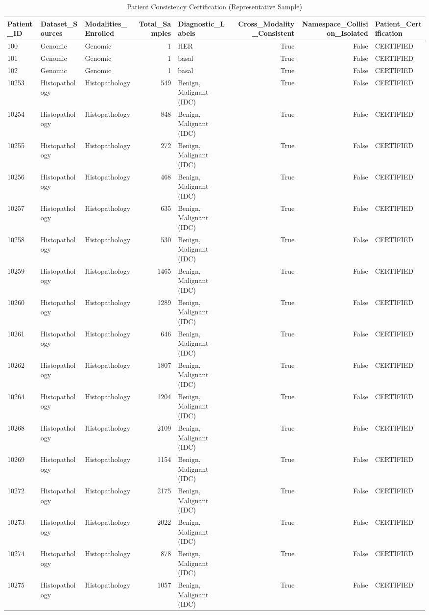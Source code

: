 \begin{table}
\caption{Patient Consistency Certification (Representative Sample)}
\label{tab:table_patient_certification}
\begin{tabular}{lllrlrrl}
\toprule
Patient\_ID & Dataset\_Sources & Modalities\_Enrolled & Total\_Samples & Diagnostic\_Labels & Cross\_Modality\_Consistent & Namespace\_Collision\_Isolated & Patient\_Certification \\
\midrule
100 & Genomic & Genomic & 1 & HER & True & False & CERTIFIED \\
101 & Genomic & Genomic & 1 & basal & True & False & CERTIFIED \\
102 & Genomic & Genomic & 1 & basal & True & False & CERTIFIED \\
10253 & Histopathology & Histopathology & 549 & Benign, Malignant (IDC) & True & False & CERTIFIED \\
10254 & Histopathology & Histopathology & 848 & Benign, Malignant (IDC) & True & False & CERTIFIED \\
10255 & Histopathology & Histopathology & 272 & Benign, Malignant (IDC) & True & False & CERTIFIED \\
10256 & Histopathology & Histopathology & 468 & Benign, Malignant (IDC) & True & False & CERTIFIED \\
10257 & Histopathology & Histopathology & 635 & Benign, Malignant (IDC) & True & False & CERTIFIED \\
10258 & Histopathology & Histopathology & 530 & Benign, Malignant (IDC) & True & False & CERTIFIED \\
10259 & Histopathology & Histopathology & 1465 & Benign, Malignant (IDC) & True & False & CERTIFIED \\
10260 & Histopathology & Histopathology & 1289 & Benign, Malignant (IDC) & True & False & CERTIFIED \\
10261 & Histopathology & Histopathology & 646 & Benign, Malignant (IDC) & True & False & CERTIFIED \\
10262 & Histopathology & Histopathology & 1807 & Benign, Malignant (IDC) & True & False & CERTIFIED \\
10264 & Histopathology & Histopathology & 1204 & Benign, Malignant (IDC) & True & False & CERTIFIED \\
10268 & Histopathology & Histopathology & 2109 & Benign, Malignant (IDC) & True & False & CERTIFIED \\
10269 & Histopathology & Histopathology & 1154 & Benign, Malignant (IDC) & True & False & CERTIFIED \\
10272 & Histopathology & Histopathology & 2175 & Benign, Malignant (IDC) & True & False & CERTIFIED \\
10273 & Histopathology & Histopathology & 2022 & Benign, Malignant (IDC) & True & False & CERTIFIED \\
10274 & Histopathology & Histopathology & 878 & Benign, Malignant (IDC) & True & False & CERTIFIED \\
10275 & Histopathology & Histopathology & 1057 & Benign, Malignant (IDC) & True & False & CERTIFIED \\
\bottomrule
\end{tabular}
\end{table}
